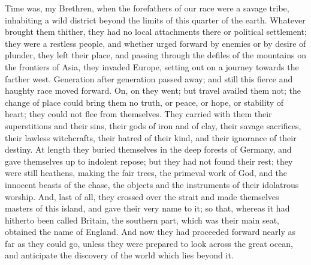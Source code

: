 Time was, my Brethren, when the forefathers of our
race were a savage tribe, inhabiting a wild district
beyond the limits of this quarter of the earth. Whatever brought them thither, they had no local attachments there
or political settlement; they were a restless people, and
whether urged forward by enemies or by desire of plunder,
they left their place, and passing through the defiles of
the mountains on the frontiers of Asia, they invaded
Europe, setting out on a journey towards the farther
west. Generation after generation passed away; and still
this fierce and haughty race moved forward. On, on they
went; but travel availed them not; the change of place
could bring them no truth, or peace, or hope, or
stability of heart; they could not flee from themselves.
They carried with them their superstitions and their
sins, their gods of iron and of clay, their savage
sacrifices, their lawless witchcrafts, their hatred of
their kind, and their ignorance of their destiny. At
length they buried themselves in the deep forests of
Germany, and gave themselves up to indolent repose; but
they had not found their rest; they were still heathens,
making the fair trees, the primeval work of God, and the
innocent beasts of the chase, the objects and the
instruments of their idolatrous worship. And, last of
all, they crossed over the strait and made themselves
masters of this island, and gave their very name to it;
so that, whereas it had hitherto been called Britain, the
southern part, which was their main seat, obtained the
name of England. And now they had proceeded forward
nearly as far as they could go, unless they were prepared
to look across the great ocean, and anticipate the
discovery of the world which lies beyond it.

